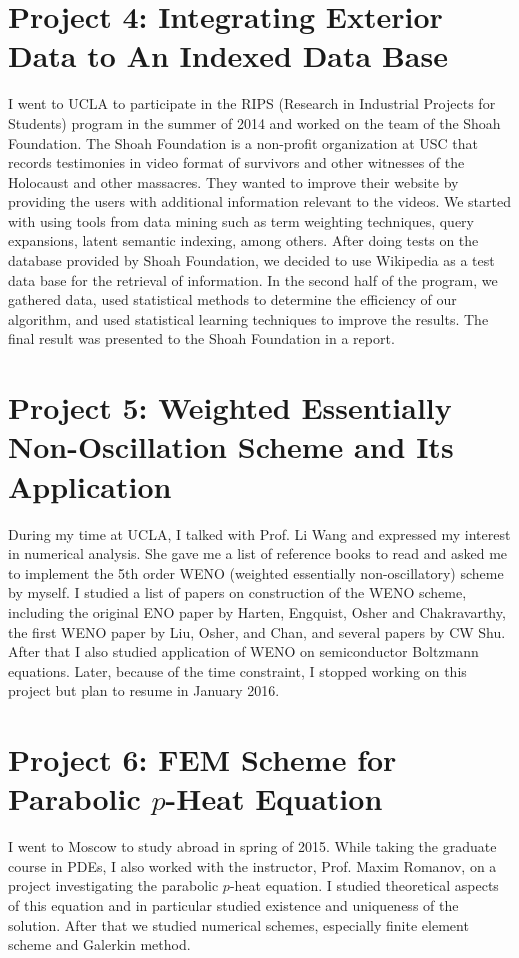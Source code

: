 \documentclass[psamsfonts,reqno]{amsart}
\theoremstyle{definition}
\begin{document}
\section*{Project 4: Integrating Exterior Data to An Indexed Data Base}

I went to UCLA to participate in the RIPS (Research in Industrial Projects for Students) program in the summer of 2014 and worked on the team of the Shoah Foundation. The Shoah Foundation is a non-profit organization at USC that records testimonies in video format of survivors and other witnesses of the Holocaust and other massacres. They wanted to improve their website by providing the users with additional information relevant to the videos. We started with using tools from data mining such as term weighting techniques, query expansions, latent semantic indexing, among others. After doing tests on the database provided by Shoah Foundation, we decided to use Wikipedia as a test data base for the retrieval of information. In the second half of the program, we gathered data, used statistical methods to determine the efficiency of our algorithm, and used statistical learning techniques to improve the results. The final result was presented to the Shoah Foundation in a report.

\section*{Project 5: Weighted Essentially Non-Oscillation Scheme and Its Application}

During my time at UCLA, I talked with Prof. Li Wang and expressed my interest in numerical analysis. She gave me a list of reference books to read and asked me to implement the 5th order WENO (weighted essentially non-oscillatory) scheme by myself. I studied a list of papers on construction of the WENO scheme, including the original ENO paper by Harten, Engquist, Osher and Chakravarthy, the first WENO paper by Liu, Osher, and Chan, and several papers by CW Shu. After that I also studied application of WENO on semiconductor Boltzmann equations. Later, because of the time constraint, I stopped working on this project but plan to resume in January 2016.

\section*{Project 6: FEM Scheme for Parabolic $p$-Heat Equation}

I went to Moscow to study abroad in spring of 2015. While taking the graduate course in PDEs, I also worked with the instructor, Prof. Maxim Romanov, on a project investigating the parabolic $p$-heat equation. I studied theoretical aspects of this equation and in particular studied existence and uniqueness of the solution. After that we studied numerical schemes, especially finite element scheme and Galerkin method.
\end{document}
